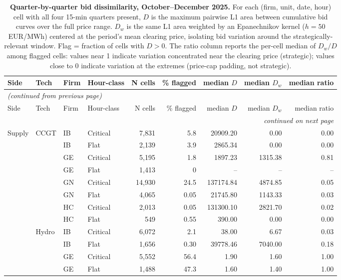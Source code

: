 \small
\begin{longtable}{@{}l l l l r r r r r@{}}
\caption{\textbf{Quarter-by-quarter bid dissimilarity, October--December 2025.} For each (firm, unit, date, hour) cell with all four 15-min quarters present, $D$ is the maximum pairwise L1 area between cumulative bid curves over the full price range. $D_w$ is the same L1 area weighted by an Epanechnikov kernel ($h = 50$ EUR/MWh) centered at the period's mean clearing price, isolating bid variation around the strategically-relevant window. Flag = fraction of cells with $D > 0$. The ratio column reports the per-cell median of $D_w/D$ among flagged cells: values near 1 indicate variation concentrated near the clearing price (strategic); values close to 0 indicate variation at the extremes (price-cap padding, not strategic).}\label{tab:quarter_dissim}\\
\toprule
Side & Tech & Firm & Hour-class & N cells & \% flagged & median $D$ & median $D_w$ & median ratio \\
\midrule
\endfirsthead
\multicolumn{9}{l}{\emph{(continued from previous page)}} \\
\toprule
Side & Tech & Firm & Hour-class & N cells & \% flagged & median $D$ & median $D_w$ & median ratio \\
\midrule
\endhead
\midrule
\multicolumn{9}{r}{\emph{continued on next page}} \\
\endfoot
\bottomrule
\endlastfoot
Supply & CCGT & IB & Critical & 7,831 & 5.8 & 20909.20 & 0.00 & 0.00 \\
 &  & IB & Flat & 2,139 & 3.9 & 2865.34 & 0.00 & 0.00 \\
 &  & GE & Critical & 5,195 & 1.8 & 1897.23 & 1315.38 & 0.81 \\
 &  & GE & Flat & 1,413 & 0 & -- & -- & -- \\
 &  & GN & Critical & 14,930 & 24.5 & 137174.84 & 4874.85 & 0.05 \\
 &  & GN & Flat & 4,065 & 0.05 & 21745.80 & 1143.33 & 0.03 \\
 &  & HC & Critical & 2,013 & 0.05 & 131300.10 & 2821.70 & 0.02 \\
 &  & HC & Flat & 549 & 0.55 & 390.00 & 0.00 & 0.00 \\
\addlinespace
 & Hydro & IB & Critical & 6,072 & 2.1 & 38.00 & 6.67 & 0.03 \\
 &  & IB & Flat & 1,656 & 0.30 & 39778.46 & 7040.00 & 0.18 \\
 &  & GE & Critical & 5,552 & 56.4 & 1.90 & 1.60 & 1.00 \\
 &  & GE & Flat & 1,488 & 47.3 & 1.60 & 1.40 & 1.00 \\

\end{longtable}
